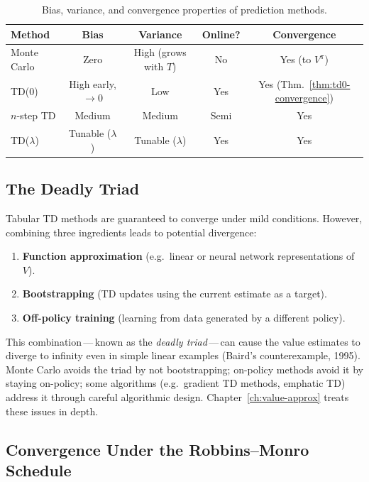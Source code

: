 \begin{table}[ht]
\centering
\caption{Bias, variance, and convergence properties of prediction methods.}
\label{tab:bias-variance-comparison}
\begin{tabular}{lcccc}
\toprule
\textbf{Method} & \textbf{Bias} & \textbf{Variance} & \textbf{Online?} & \textbf{Convergence}\\
\midrule
Monte Carlo & Zero & High (grows with $T$) & No & Yes (to $V^\pi$)\\
TD(0) & High early, $\to 0$ & Low & Yes & Yes (Thm.~\ref{thm:td0-convergence})\\
$n$-step TD & Medium & Medium & Semi & Yes\\
TD($\lambda$) & Tunable ($\lambda$) & Tunable ($\lambda$) & Yes & Yes\\
\bottomrule
\end{tabular}
\end{table}

\subsection{The Deadly Triad}

Tabular TD methods are guaranteed to converge under mild conditions.  However, combining three ingredients leads to potential divergence:
\begin{enumerate}
  \item \textbf{Function approximation} (e.g.\ linear or neural network representations of $V$).
  \item \textbf{Bootstrapping} (TD updates using the current estimate as a target).
  \item \textbf{Off-policy training} (learning from data generated by a different policy).
\end{enumerate}
This combination\,---\,known as the \emph{deadly triad}\,---\,can cause the value estimates to diverge to infinity even in simple linear examples (Baird's counterexample, 1995).  Monte Carlo avoids the triad by not bootstrapping; on-policy methods avoid it by staying on-policy; some algorithms (e.g.\ gradient TD methods, emphatic TD) address it through careful algorithmic design.  Chapter~\ref{ch:value-approx} treats these issues in depth.

\subsection{Convergence Under the Robbins--Monro Schedule}

